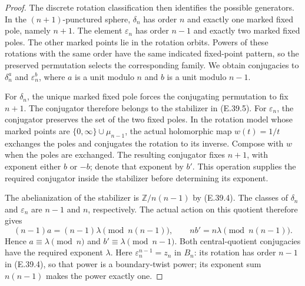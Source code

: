 \begin{proof}
The discrete rotation classification
\cite[Theorem 3.1 and Corollary 3.2]{ERootCollas2012}
then identifies the possible generators.  In the
$(n+1)$-punctured sphere, $\delta_n$ has order $n$
and exactly one marked fixed pole, namely $n+1$.
The element $\varepsilon_n$ has order $n-1$ and
exactly two marked fixed poles.  The other marked
points lie in the rotation orbits.  Powers of these
rotations with the same order have the same indicated
fixed-point pattern, so the preserved permutation
selects the corresponding family.  We obtain
conjugacies to $\delta_n^a$ and $\varepsilon_n^b$,
where $a$ is a unit modulo $n$ and $b$ is a unit
modulo $n-1$.

For $\delta_n$, the unique marked fixed pole forces
the conjugating permutation to fix $n+1$.  The
conjugator therefore belongs to the stabilizer
in \textup{(E.39.5)}.  For $\varepsilon_n$, the
conjugator preserves the set of the two fixed poles.
In the rotation model whose marked points are
$\{0,\infty\}\cup\mu_{n-1}$, the actual holomorphic
map $w(t)=1/t$ exchanges the poles and conjugates
the rotation to its inverse.  Compose with $w$
when the poles are exchanged.  The resulting
conjugator fixes $n+1$, with exponent either $b$
or $-b$; denote that exponent by $b'$.
This operation supplies the required conjugator
inside the stabilizer before determining its exponent.

The abelianization of the stabilizer is
$\mathbb Z/n(n-1)$ by \textup{(E.39.4)}.
The classes of $\delta_n$ and $\varepsilon_n$
are $n-1$ and $n$, respectively.  The actual
action on this quotient therefore gives
\[
 (n-1)a=(n-1)\lambda\pmod{n(n-1)},\qquad
 nb'=n\lambda\pmod{n(n-1)}.
 \tag{E.39.6}
\]
Hence $a\equiv\lambda\pmod n$ and
$b'\equiv\lambda\pmod{n-1}$.  Both central-quotient
conjugacies have the required exponent $\lambda$.
Here $\varepsilon_n^{n-1}=z_n$ in $B_n$:
its rotation has order $n-1$ in \textup{(E.39.4)},
so that power is a boundary-twist power; its
exponent sum $n(n-1)$ makes the power exactly one.


\end{proof}
